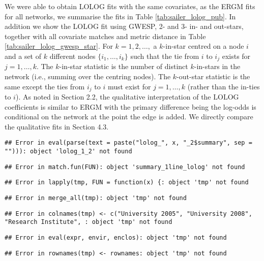 \documentclass[
]{statsoc}
\begin{document}
We were able to obtain LOLOG fits with the same covariates, as the ERGM
fits for all networks, we summarise the fits in Table
\ref{tab:sailer_lolog_pub}. In addition we show the LOLOG fit using
GWESP, 2- and 3- in- and out-stars, together with all covariate matches
and metric distance in Table \ref{tab:sailer_lolog_gwesp_star}. For
\(k=1, 2, \ldots,\) a \(k\)-in-star centred on a node \(i\) and a set of
\(k\) different nodes \(\{i_1, \ldots, i_{k}\}\) such that the tie from
\(i\) to \(i_{j}\) exists for \(j=1, \ldots, k\). The \(k\)-in-star
statistic is the number of distinct \(k\)-in-stars in the network (i.e.,
summing over the centring nodes). The \(k\)-out-star statistic is the
same except the ties from \(i_{j}\) to \(i\) must exist for
\(j=1, \ldots, k\) (rather than the in-ties to \(i\)). As noted in
Section 2.2, the qualitative interpretation of the LOLOG coefficients is
similar to ERGM with the primary difference being the log-odds is
conditional on the network at the point the edge is added. We directly
compare the qualitative fits in Section 4.3.

\begin{verbatim}
## Error in eval(parse(text = paste("lolog_", x, "_2$summary", sep = ""))): object 'lolog_1_2' not found
\end{verbatim}

\begin{verbatim}
## Error in match.fun(FUN): object 'summary_1line_lolog' not found
\end{verbatim}

\begin{verbatim}
## Error in lapply(tmp, FUN = function(x) {: object 'tmp' not found
\end{verbatim}

\begin{verbatim}
## Error in merge_all(tmp): object 'tmp' not found
\end{verbatim}

\begin{verbatim}
## Error in colnames(tmp) <- c("University 2005", "University 2008", "Research Institute", : object 'tmp' not found
\end{verbatim}

\begin{verbatim}
## Error in eval(expr, envir, enclos): object 'tmp' not found
\end{verbatim}

\begin{verbatim}
## Error in rownames(tmp) <- rownames: object 'tmp' not found
\end{verbatim}
\end{document}
